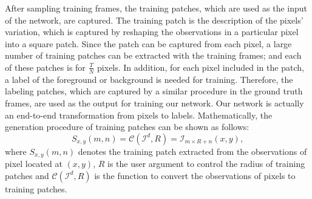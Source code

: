 \documentclass[journal]{IEEEtran}
\begin{document}
After sampling training frames,
the training patches, which are used as the input of the network, are captured.
%
The training patch is the description of the pixels' variation,
which is captured by reshaping the observations in a particular pixel into a square patch.
%
Since the patch can be captured from each pixel, 
a large number of training patches can be extracted with the training frames;
and each of these patches is for $\frac{T}{N}$ pixels.
%
In addition, for each pixel included in the patch, a label of the foreground or background is needed for training.
%
Therefore,
the labeling patches, which are captured by a similar procedure in the ground truth frames,
are used as the output for training our network.
Our network is actually an end-to-end transformation from pixels to labels.
%
Mathematically, the generation procedure of training patches can be shown as follows:
\begin{equation}
    S_{x,y}(m,n) = \mathcal{C}(\mathcal{I}^d, R) = \mathcal{I}_{m \times R + n} (x,y),
    \label{eq_reshape}
\end{equation}
where $S_{x,y}(m,n)$ denotes the training patch extracted from the observations of pixel located at $(x,y)$,
$R$ is the user argument to control the radius of training patches
and $\mathcal{C}(\mathcal{I}^d, R)$ is the function to convert the observations of pixels to training patches.
% 
% 
% 
% 
% 
% 
% 
% 
% 
% 
% 
\end{document}
